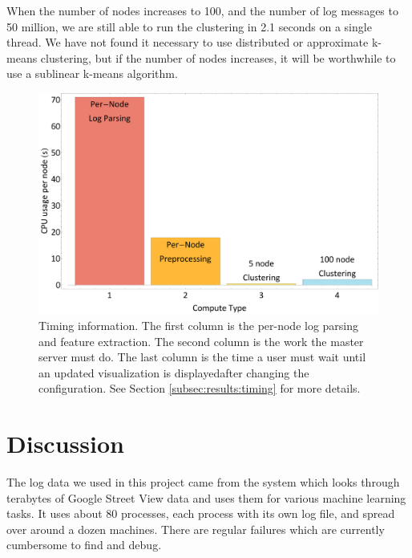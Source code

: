 \documentclass[conference]{style/acmsiggraph}
\begin{document}
When the number of nodes increases to 100, and the number of log messages to 50 million, we are still able to run the clustering in 2.1 seconds on a single thread.
We have not found it necessary to use distributed or approximate k-means clustering, but if the number of nodes increases, it will be worthwhile to use a sublinear k-means algorithm.

\begin{figure}[t]
    \centering
    \includegraphics[width=1.0\columnwidth]{images/timing.pdf}
    \caption{Timing information. The first column is the per-node log parsing and feature extraction. The second column is the work the master server must do. The last column is the time a user must wait until an updated visualization is displayedafter changing the configuration. See Section \ref{subsec:results:timing} for more details.}
    \label{fig:timings}
\end{figure}


\section{Discussion}

The log data we used in this project came from the system which looks through terabytes of Google
Street View data and uses them for various machine learning tasks. It uses about 80 processes, each
process with its own log file, and spread over around a dozen machines. There are regular failures
which are currently cumbersome to find and debug.
\end{document}
